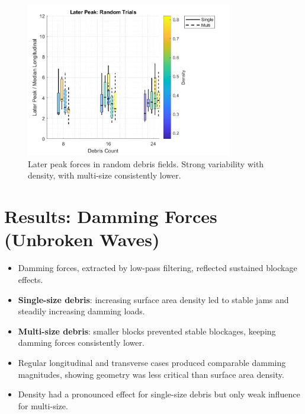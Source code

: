 \documentclass{article}
\begin{document}
\begin{figure}[htbp]
    \centering
    \includegraphics[width=0.8\textwidth]{LaterPeak_Random_Single_vs_Multi_ByDensityGradient.png}
    \caption{Later peak forces in random debris fields. Strong variability with density, with multi-size consistently lower.}
    \label{fig:random_peaks_later}
\end{figure}

\section{Results: Damming Forces (Unbroken Waves)}
\begin{itemize}
    \item Damming forces, extracted by low-pass filtering, reflected sustained blockage effects.
    \item \textbf{Single-size debris}: increasing surface area density led to stable jams and steadily increasing damming loads.
    \item \textbf{Multi-size debris}: smaller blocks prevented stable blockages, keeping damming forces consistently lower.
    \item Regular longitudinal and transverse cases produced comparable damming magnitudes, showing geometry was less critical than surface area density.
    \item Density had a pronounced effect for single-size debris but only weak influence for multi-size.
\end{itemize}
\end{document}
